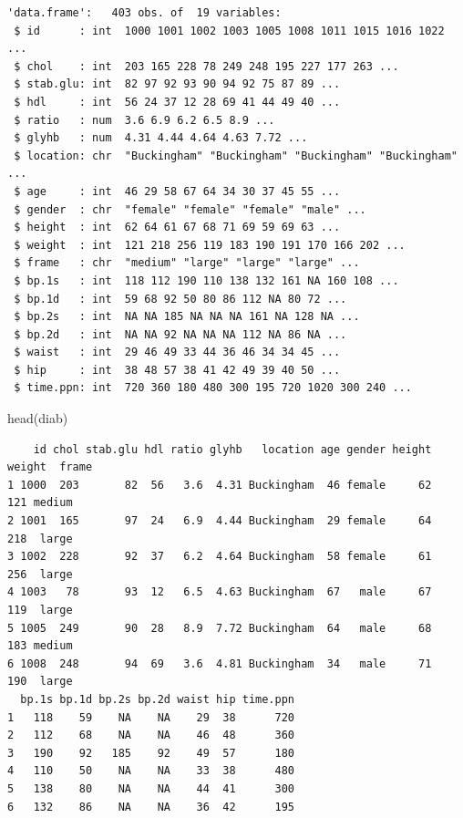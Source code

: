 \documentclass[
  11pt,
]{krantz}
\newenvironment{Shaded}{\begin{snugshade}}{\end{snugshade}}
\newcommand{\FunctionTok}[1]{\textcolor[rgb]{0,0,0}{#1}}
\newcommand{\NormalTok}[1]{#1}
\begin{document}
\begin{verbatim}
'data.frame':   403 obs. of  19 variables:
 $ id      : int  1000 1001 1002 1003 1005 1008 1011 1015 1016 1022 ...
 $ chol    : int  203 165 228 78 249 248 195 227 177 263 ...
 $ stab.glu: int  82 97 92 93 90 94 92 75 87 89 ...
 $ hdl     : int  56 24 37 12 28 69 41 44 49 40 ...
 $ ratio   : num  3.6 6.9 6.2 6.5 8.9 ...
 $ glyhb   : num  4.31 4.44 4.64 4.63 7.72 ...
 $ location: chr  "Buckingham" "Buckingham" "Buckingham" "Buckingham" ...
 $ age     : int  46 29 58 67 64 34 30 37 45 55 ...
 $ gender  : chr  "female" "female" "female" "male" ...
 $ height  : int  62 64 61 67 68 71 69 59 69 63 ...
 $ weight  : int  121 218 256 119 183 190 191 170 166 202 ...
 $ frame   : chr  "medium" "large" "large" "large" ...
 $ bp.1s   : int  118 112 190 110 138 132 161 NA 160 108 ...
 $ bp.1d   : int  59 68 92 50 80 86 112 NA 80 72 ...
 $ bp.2s   : int  NA NA 185 NA NA NA 161 NA 128 NA ...
 $ bp.2d   : int  NA NA 92 NA NA NA 112 NA 86 NA ...
 $ waist   : int  29 46 49 33 44 36 46 34 34 45 ...
 $ hip     : int  38 48 57 38 41 42 49 39 40 50 ...
 $ time.ppn: int  720 360 180 480 300 195 720 1020 300 240 ...
\end{verbatim}

\begin{Shaded}
\begin{Highlighting}[]
\FunctionTok{head}\NormalTok{(diab)}
\end{Highlighting}
\end{Shaded}

\begin{verbatim}
    id chol stab.glu hdl ratio glyhb   location age gender height weight  frame
1 1000  203       82  56   3.6  4.31 Buckingham  46 female     62    121 medium
2 1001  165       97  24   6.9  4.44 Buckingham  29 female     64    218  large
3 1002  228       92  37   6.2  4.64 Buckingham  58 female     61    256  large
4 1003   78       93  12   6.5  4.63 Buckingham  67   male     67    119  large
5 1005  249       90  28   8.9  7.72 Buckingham  64   male     68    183 medium
6 1008  248       94  69   3.6  4.81 Buckingham  34   male     71    190  large
  bp.1s bp.1d bp.2s bp.2d waist hip time.ppn
1   118    59    NA    NA    29  38      720
2   112    68    NA    NA    46  48      360
3   190    92   185    92    49  57      180
4   110    50    NA    NA    33  38      480
5   138    80    NA    NA    44  41      300
6   132    86    NA    NA    36  42      195
\end{verbatim}

\normalsize
\end{document}
